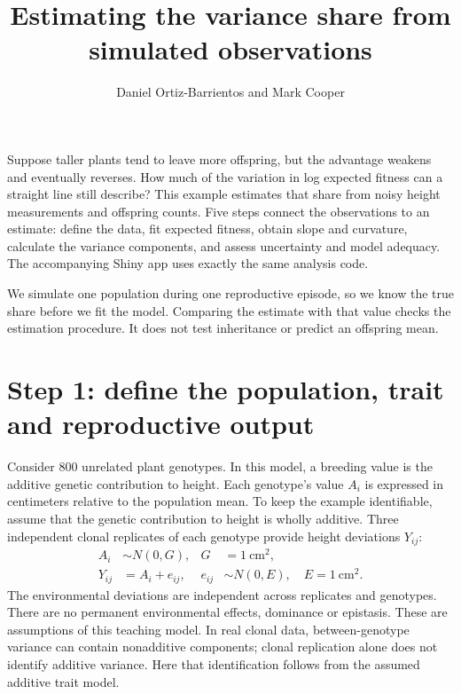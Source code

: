 \documentclass[11pt]{article}
\title{Estimating the variance share from simulated observations}
\author{Daniel Ortiz-Barrientos and Mark Cooper}
\date{}
\begin{document}
\maketitle

Suppose taller plants tend to leave more offspring, but the advantage weakens and eventually reverses. How much of the variation in log expected fitness can a straight line still describe? This example estimates that share from noisy height measurements and offspring counts. Five steps connect the observations to an estimate: define the data, fit expected fitness, obtain slope and curvature, calculate the variance components, and assess uncertainty and model adequacy. The accompanying Shiny app uses exactly the same analysis code.

We simulate one population during one reproductive episode, so we know the true share before we fit the model. Comparing the estimate with that value checks the estimation procedure. It does not test inheritance or predict an offspring mean.

\section{Step 1: define the population, trait and reproductive output}

Consider 800 unrelated plant genotypes. In this model, a breeding value is the additive genetic contribution to height. Each genotype's value $A_i$ is expressed in centimeters relative to the population mean. To keep the example identifiable, assume that the genetic contribution to height is wholly additive. Three independent clonal replicates of each genotype provide height deviations $Y_{ij}$:
\begin{align}
 A_i&\sim N(0,G), & G&=1\ \mathrm{cm}^2,\label{eq:A}\\
 Y_{ij}&=A_i+e_{ij}, & e_{ij}&\sim N(0,E),\quad E=1\ \mathrm{cm}^2.\label{eq:measurement}
\end{align}
The environmental deviations are independent across replicates and genotypes. There are no permanent environmental effects, dominance or epistasis. These are assumptions of this teaching model. In real clonal data, between-genotype variance can contain nonadditive components; clonal replication alone does not identify additive variance. Here that identification follows from the assumed additive trait model.
\end{document}
